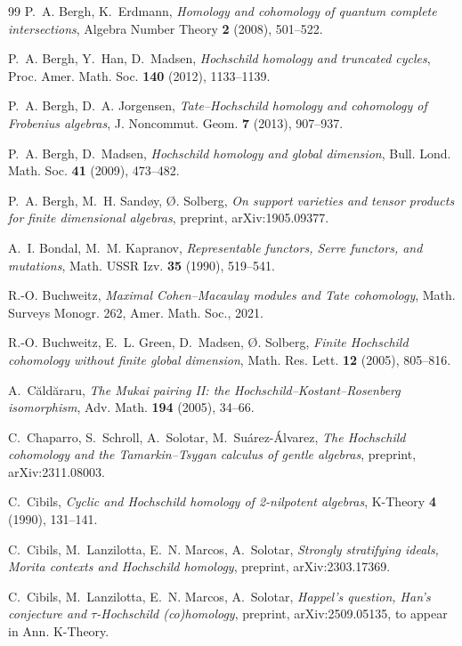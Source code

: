 \documentclass[11pt]{amsart}
\theoremstyle{definition}
\begin{document}
\begin{thebibliography}{99}
 P.~A. Bergh, K.~Erdmann, \emph{Homology and cohomology
of quantum complete intersections}, Algebra Number Theory \textbf{2} (2008),
501--522.

 P.~A. Bergh, Y.~Han, D.~Madsen, \emph{Hochschild
homology and truncated cycles}, Proc. Amer. Math. Soc. \textbf{140} (2012),
1133--1139.

 P.~A. Bergh, D.~A. Jorgensen, \emph{Tate--Hochschild
homology and cohomology of Frobenius algebras}, J. Noncommut. Geom.
\textbf{7} (2013), 907--937.

 P.~A. Bergh, D.~Madsen, \emph{Hochschild homology and
global dimension}, Bull. Lond. Math. Soc. \textbf{41} (2009), 473--482.

 P.~A. Bergh, M.~H. Sand\o y, \O. Solberg, \emph{On support
varieties and tensor products for finite dimensional algebras}, preprint,
arXiv:1905.09377.

 A.~I. Bondal, M.~M. Kapranov, \emph{Representable
functors, Serre functors, and mutations}, Math. USSR Izv. \textbf{35} (1990),
519--541.

 R.-O. Buchweitz, \emph{Maximal Cohen--Macaulay modules
and Tate cohomology}, Math. Surveys Monogr. 262, Amer. Math. Soc., 2021.

 R.-O. Buchweitz, E.~L. Green, D.~Madsen, \O. Solberg,
\emph{Finite Hochschild cohomology without finite global dimension}, Math.
Res. Lett. \textbf{12} (2005), 805--816.

 A.~C\u ald\u araru, \emph{The Mukai pairing II: the
Hochschild--Kostant--Rosenberg isomorphism}, Adv. Math. \textbf{194} (2005),
34--66.

 C.~Chaparro, S.~Schroll, A.~Solotar, M.~Su\'arez-\'Alvarez,
\emph{The Hochschild cohomology and the Tamarkin--Tsygan calculus of gentle
algebras}, preprint, arXiv:2311.08003.

 C.~Cibils, \emph{Cyclic and Hochschild homology of
2-nilpotent algebras}, K-Theory \textbf{4} (1990), 131--141.

 C.~Cibils, M.~Lanzilotta, E.~N. Marcos, A.~Solotar,
\emph{Strongly stratifying ideals, Morita contexts and Hochschild homology},
preprint, arXiv:2303.17369.

 C.~Cibils, M.~Lanzilotta, E.~N. Marcos, A.~Solotar,
\emph{Happel's question, Han's conjecture and $\tau$-Hochschild
(co)homology}, preprint, arXiv:2509.05135, to appear in Ann. K-Theory.


\end{thebibliography}
\end{document}
